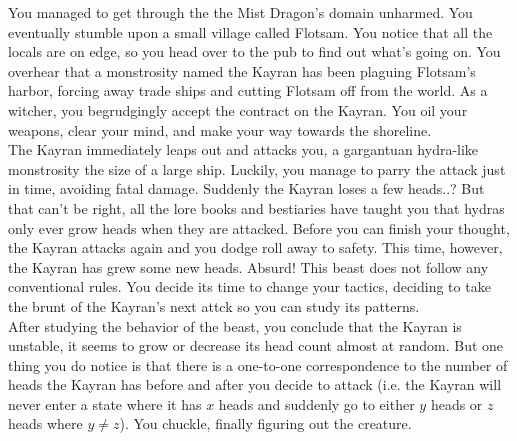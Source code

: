 
\noindent You managed to get through the the Mist Dragon's domain unharmed. You eventually stumble upon a small village
called Flotsam. You notice that all the locals are on edge, so you head over to the pub to find out what's going on. You overhear that
a monstrosity named the Kayran has been plaguing Flotsam's harbor, forcing away trade ships and cutting Flotsam off from the world.
As a witcher, you begrudgingly accept the contract on the Kayran. You oil your weapons, clear your mind, and make your way
towards the shoreline.\\

\noindent The Kayran immediately leaps out and attacks you, a gargantuan hydra-like monstrosity the size of a large ship. Luckily, you manage 
to parry the attack just in time, avoiding fatal damage. Suddenly the Kayran loses a few heads..? But that can't be right, 
all the lore books and bestiaries have taught you that hydras only ever grow heads when they are attacked. Before you can finish 
your thought, the Kayran attacks again and you dodge roll away to safety. This time, however, the Kayran has grew some new heads. 
Absurd! This beast does not follow any conventional rules. You decide its time to change your tactics, deciding to take the
brunt of the Kayran's next attck so you can study its patterns. \\

\noindent After studying the behavior of the beast, you conclude that the Kayran is unstable, it seems to grow or decrease its 
head count almost at random. But one thing you do notice is that there is a one-to-one correspondence to the number of heads 
the Kayran has before and after you decide to attack (i.e. the Kayran will never enter a state where it has $x$ heads and suddenly 
go to either $y$ heads or $z$ heads where $y \neq z$). You chuckle, finally figuring out the creature.\\

